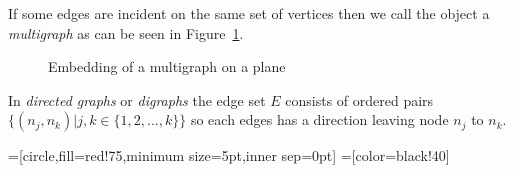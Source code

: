 If some edges are incident on the same set of vertices then we call the object a \textit{multigraph} as can be seen in 
Figure~\ref{fig:multi}.

\begin{figure}[ht]
  \caption{Embedding of a multigraph on a plane}
  \label{fig:multi}
\end{figure}

In \textit{directed graphs} or \textit{digraphs} the edge set $ E $ consists of ordered pairs $ \{(n_j, n_k) | j,k \in \{1, 2, ..., k\}\} $ 
so each edges has a direction leaving node $ n_j $ to $ n_k $.

=[circle,fill=red!75,minimum size=5pt,inner sep=0pt]
=[color=black!40]

